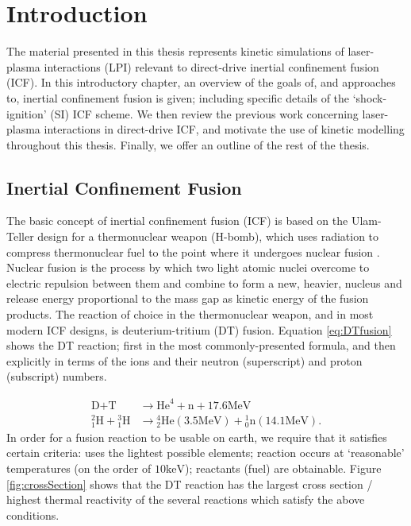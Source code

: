 \chapter{Introduction}
\label{chp:introduction}
The material presented in this thesis represents kinetic simulations of laser-plasma interactions (\acrshort{LPI}) relevant to direct-drive inertial confinement fusion (\acrshort{ICF}). In this introductory chapter, an overview of the goals of, and approaches to, inertial confinement fusion is given; including specific details of the `shock-ignition' (\acrshort{SI}) ICF scheme. We then review the previous work concerning laser-plasma interactions in direct-drive ICF, and motivate the use of kinetic modelling throughout this thesis. Finally, we offer an outline of the rest of the thesis.

\section{Inertial Confinement Fusion}
The basic concept of inertial confinement fusion (\acrshort{ICF}) is based on the Ulam-Teller design for a thermonuclear weapon (H-bomb), which uses radiation to compress thermonuclear fuel to the point where it undergoes nuclear fusion \citep{SpanishHistoryOfICF}.  Nuclear fusion is the process by which two light atomic nuclei overcome to electric repulsion between them and combine to form a new, heavier, nucleus and release energy proportional to the mass gap as kinetic energy of the fusion products. The reaction of choice in the thermonuclear weapon, and in most modern ICF designs, is deuterium-tritium (\acrshort{DT}) fusion. Equation \ref{eq:DTfusion} shows the \acrshort{DT}  reaction; first in the most commonly-presented formula, and then explicitly in terms of the ions and their neutron (superscript) and proton (subscript) numbers.

\begin{equation}\label{eq:DTfusion}
\begin{aligned}
	\text{D} + \text{T} &\longrightarrow \text{He}^4 + \text{n} + 17.6 \si{\mega\electronvolt}\\
	{}^2_1\text{H} + {}^3_1\text{H} &\longrightarrow {}^4_2\text{He} (3.5\si{\mega\electronvolt}) + {}^1_0\text{n} (14.1\si{\mega\electronvolt}).
\end{aligned}
\end{equation}
In order for a fusion reaction to be usable on earth, we require that it satisfies certain criteria: uses the lightest possible elements; reaction occurs at `reasonable' temperatures (on the order of $10 \si{\kilo\eV}$); reactants (fuel) are obtainable. Figure \ref{fig:crossSection} shows that the \acrshort{DT} reaction has the largest cross section / highest thermal reactivity of the several reactions which satisfy the above conditions.

